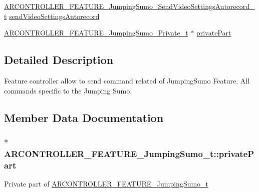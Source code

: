 \begin{DoxyCompactItemize}
\item 
\hyperlink{_a_r_c_o_n_t_r_o_l_l_e_r___feature_8h_aa36dac29e85fba523d644e3547b0814b}{A\+R\+C\+O\+N\+T\+R\+O\+L\+L\+E\+R\+\_\+\+F\+E\+A\+T\+U\+R\+E\+\_\+\+Jumping\+Sumo\+\_\+\+Send\+Video\+Settings\+Autorecord\+\_\+t} \hyperlink{struct_a_r_c_o_n_t_r_o_l_l_e_r___f_e_a_t_u_r_e___jumping_sumo__t_a27442d7109ceeef298154bebcbb74ef5}{send\+Video\+Settings\+Autorecord}
\item 
\hyperlink{_a_r_c_o_n_t_r_o_l_l_e_r___feature_8h_a1ba241cc26c5fbadbab8a1fe3443429a}{A\+R\+C\+O\+N\+T\+R\+O\+L\+L\+E\+R\+\_\+\+F\+E\+A\+T\+U\+R\+E\+\_\+\+Jumping\+Sumo\+\_\+\+Private\+\_\+t} $\ast$ \hyperlink{struct_a_r_c_o_n_t_r_o_l_l_e_r___f_e_a_t_u_r_e___jumping_sumo__t_a0bd68d17d50f40ff262dd62034d7a192}{private\+Part}
\end{DoxyCompactItemize}


\subsection{Detailed Description}
Feature controller allow to send command related of Jumping\+Sumo Feature. All commands specific to the Jumping Sumo. 

\subsection{Member Data Documentation}
\subsubsection[{\texorpdfstring{private\+Part}{privatePart}}]{$\ast$ A\+R\+C\+O\+N\+T\+R\+O\+L\+L\+E\+R\+\_\+\+F\+E\+A\+T\+U\+R\+E\+\_\+\+Jumping\+Sumo\+\_\+t\+::private\+Part}\hypertarget{struct_a_r_c_o_n_t_r_o_l_l_e_r___f_e_a_t_u_r_e___jumping_sumo__t_a0bd68d17d50f40ff262dd62034d7a192}{}\label{struct_a_r_c_o_n_t_r_o_l_l_e_r___f_e_a_t_u_r_e___jumping_sumo__t_a0bd68d17d50f40ff262dd62034d7a192}
Private part of \hyperlink{struct_a_r_c_o_n_t_r_o_l_l_e_r___f_e_a_t_u_r_e___jumping_sumo__t}{A\+R\+C\+O\+N\+T\+R\+O\+L\+L\+E\+R\+\_\+\+F\+E\+A\+T\+U\+R\+E\+\_\+\+Jumping\+Sumo\+\_\+t} 

